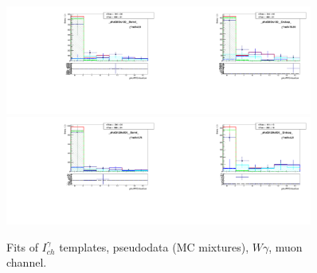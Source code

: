 \begin{figure}[htb]
\begin{center}
   \includegraphics[width=0.45\textwidth]{../figs/figs_v11/MUON_WGamma/TemplateFits/c_TEMPL_CHISO_UNblind__phoEt95to120__Barrel__RooFit_MCclosure.pdf}\includegraphics[width=0.45\textwidth]{../figs/figs_v11/MUON_WGamma/TemplateFits/c_TEMPL_CHISO_UNblind__phoEt95to120__Endcap__RooFit_MCclosure.pdf}\\
   \includegraphics[width=0.45\textwidth]{../figs/figs_v11/MUON_WGamma/TemplateFits/c_TEMPL_CHISO_UNblind__phoEt120to500__Barrel__RooFit_MCclosure.pdf}\includegraphics[width=0.45\textwidth]{../figs/figs_v11/MUON_WGamma/TemplateFits/c_TEMPL_CHISO_UNblind__phoEt120to500__Endcap__RooFit_MCclosure.pdf}\\
  \label{fig:templateFits_MCclosure_CHISO_MUON_3}
  \caption{Fits of $I_{ch}^{\gamma}$ templates, pseudodata (MC mixtures), $W\gamma$, muon channel.}
  \end{center}
\end{figure}

